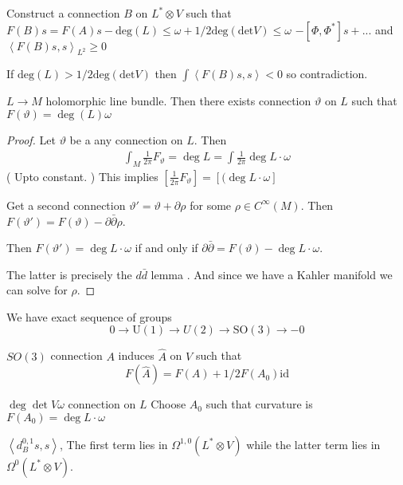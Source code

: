 Construct a connection $B$ on $L^* \otimes V$ such that 
$F(B) s = F(A) s - \mathrm{deg} ( L) \leq \omega + 1/2 \mathrm{deg}( \mathrm{det} V ) \leq \omega $ 
$ - [\Phi , \Phi ^* ] s + ... $ 
and 
$ \left< F(B) s, s \right> _{L^2} \geq 0 $ 

If $ \mathrm{deg}(L) > 1/2 \mathrm{deg} (\mathrm{det} V)$ then $ \int \left< F(B) s, s \right> < 0 $  so contradiction.

\begin{lemma}
 $ L \rightarrow M $ holomorphic line bundle. 
    Then there exists connection $ \vartheta$ on $ L $ such that $ F(\vartheta) = \deg ( L) \omega $ 
\end{lemma}

\begin{proof} 
    Let $ \vartheta $ be a any connection on $ L $. 
    Then 
    \begin{align}
        \int _M \frac{1}{2 \pi}   F_\vartheta = \deg L = \int \frac{1}{2 \pi } \deg L \cdot \omega 
    \end{align}
    ( Upto constant. )
    This implies $ [ \frac{1}{2 \pi} F_\vartheta] = [ ( \deg L \cdot \omega ]  $ 

    Get a second connection $ \vartheta ' =  \vartheta + \partial \rho $ for some $ \rho  \in C^\infty (M) $. 
    Then $ F(\vartheta' ) = F(\vartheta) - \partial \bar{ \partial} \rho $. 

    Then $ F(\vartheta ' ) = \deg L \cdot \omega $ if and only if 
    $ \partial \bar{\partial } =  F(\vartheta) - \deg L \cdot \omega $. 

    The latter is precisely the $ d \bar{d} $ lemma . 
    And since we have a Kahler manifold we can solve for $\rho$. 
\end{proof}

We have exact sequence of groups 
\begin{equation}
    0 \rightarrow\mathrm{U}(1)  \rightarrow U ( 2) \rightarrow  \mathrm{SO}(3) \rightarrow  -0 
\end{equation}

$SO(3) $ connection $A$ induces $ \hat{A} $ on $V$ such that 
\begin{equation}
    F (\hat{A} ) = F ( A) + 1/2 F( A_0 ) \mathrm{id} 
\end{equation}

$\deg \det V \omega $ 
connection on $L$ 
Choose $A_0 $ such that curvature is $ F(A_0 )  = \deg L \cdot \omega $ 

$ \left< d_B ^{0,1} s, s \right> $, 
The first term lies in $ \Omega^{1,0} ( L^* \otimes V ) $ while the latter term lies in $ \Omega^{0} ( L^* \otimes V ) $.

